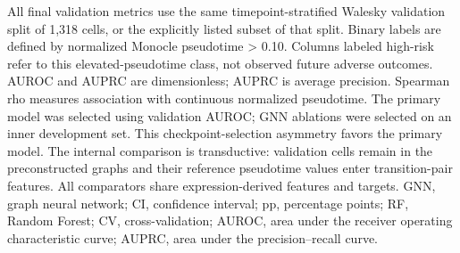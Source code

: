 All final validation metrics use the same timepoint-stratified Walesky validation split of 1,318 cells, or the explicitly listed subset of that split. Binary labels are defined by normalized Monocle pseudotime > 0.10. Columns labeled high-risk refer to this elevated-pseudotime class, not observed future adverse outcomes. AUROC and AUPRC are dimensionless; AUPRC is average precision. Spearman rho measures association with continuous normalized pseudotime. The primary model was selected using validation AUROC; GNN ablations were selected on an inner development set. This checkpoint-selection asymmetry favors the primary model. The internal comparison is transductive: validation cells remain in the preconstructed graphs and their reference pseudotime values enter transition-pair features. All comparators share expression-derived features and targets. GNN, graph neural network; CI, confidence interval; pp, percentage points; RF, Random Forest; CV, cross-validation; AUROC, area under the receiver operating characteristic curve; AUPRC, area under the precision--recall curve.